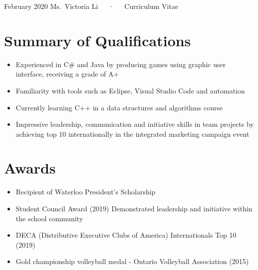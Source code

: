 \documentclass[11pt, a4paper]{awesome-cv}
\providecommand{\tightlist}{%
	\setlength{\itemsep}{0pt}\setlength{\parskip}{0pt}}
\begin{document}
\makecvheader

\makecvfooter
  {February 2020}
    {Ms.~Victoria Li~~~·~~~Curriculum Vitae}
  {\thepage}





\hypertarget{summary-of-qualifications}{%
\section{Summary of Qualifications}\label{summary-of-qualifications}}

\begin{itemize}
\tightlist
\item
  Experienced in C\# and Java by producing games using graphic user interface, receiving a grade of A+
\item
  Familiarity with tools such as Eclipse, Visual Studio Code and automation
\item
  Currently learning C++ in a data structures and algorithms course
\item
  Impressive leadership, communication and initiative skills in team projects by
  achieving top 10 internationally in the integrated marketing campaign event
\end{itemize}

\hypertarget{awards}{%
\section{Awards}\label{awards}}

\begin{itemize}
\tightlist
\item
  Recipient of Waterloo President's Scholarship
\item
  Student Council Award (2019)
  Demonstrated leadership and initiative within the school community
\item
  DECA (Distributive Executive Clubs of America) Internationals Top 10 (2019)
\item
  Gold championship volleyball medal - Ontario Volleyball Association (2015)
\end{itemize}
\end{document}
